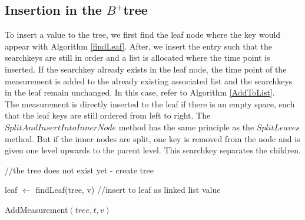 \documentclass[abstracton,12pt,oneside]{scrreprt}
\begin{document}
\subsection{Insertion in the $B^+$tree}
\label{insertionTree}
To insert a value to the tree, we first find the leaf node where the key would appear with Algorithm \ref{findLeaf}. After, we insert the entry such that the searchkeys are still in order and a list is allocated where the time point is inserted. If the searchkey already exists in the leaf node, the time point of the measurement is added to the already existing associated list and the searchkeys in the leaf remain unchanged. In this case, refer to Algorithm \ref{AddToList}. \\
The measurement is directly inserted to the leaf if there is an empty space, such that the leaf keys are still ordered from left to right. The $SplitAndInsertIntoInnerNode$ method has the same principle as the $SplitLeaves$ method. But if the inner nodes are split, one key is removed from the node and is given one level upwards to the parent level. This searchkey separates the children. 
\BlankLine
\begin{algorithm}[H]
	\IncMargin{1em}
	\SetAlgoLined
	\DontPrintSemicolon
	

		

		 //the tree does not exist yet - create tree\;
		    
		 leaf $\leftarrow$ findLeaf(tree, v)\;
		//insert to leaf as linked list value\;
	
		
	
	

	\caption{AddMeasurement$(tree, t, v)$}	\label{AddMeasurement}
\end{algorithm}
\end{document}
